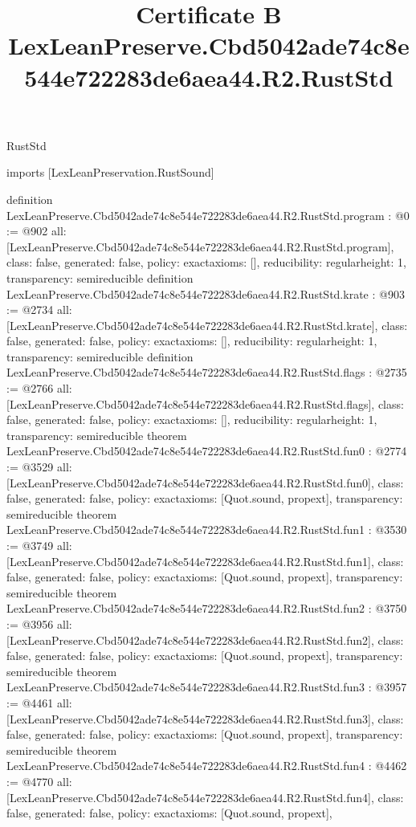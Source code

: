 \begin{lexlean}{RustStd}
\title{Certificate B LexLeanPreserve.Cbd5042ade74c8e544e722283de6aea44.R2.RustStd}
\begin{coremodule}
imports [LexLeanPreservation.RustSound]

definition LexLeanPreserve.Cbd5042ade74c8e544e722283de6aea44.R2.RustStd.program : @0 := @902 {
  all: [LexLeanPreserve.Cbd5042ade74c8e544e722283de6aea44.R2.RustStd.program],
  class: false,
  generated: false,
  policy: exact{axioms: []},
  reducibility: regular{height: 1},
  transparency: semireducible
}
definition LexLeanPreserve.Cbd5042ade74c8e544e722283de6aea44.R2.RustStd.krate : @903 := @2734 {
  all: [LexLeanPreserve.Cbd5042ade74c8e544e722283de6aea44.R2.RustStd.krate],
  class: false,
  generated: false,
  policy: exact{axioms: []},
  reducibility: regular{height: 1},
  transparency: semireducible
}
definition LexLeanPreserve.Cbd5042ade74c8e544e722283de6aea44.R2.RustStd.flags : @2735 := @2766 {
  all: [LexLeanPreserve.Cbd5042ade74c8e544e722283de6aea44.R2.RustStd.flags],
  class: false,
  generated: false,
  policy: exact{axioms: []},
  reducibility: regular{height: 1},
  transparency: semireducible
}
theorem LexLeanPreserve.Cbd5042ade74c8e544e722283de6aea44.R2.RustStd.fun0 : @2774 := @3529 {
  all: [LexLeanPreserve.Cbd5042ade74c8e544e722283de6aea44.R2.RustStd.fun0],
  class: false,
  generated: false,
  policy: exact{axioms: [Quot.sound, propext]},
  transparency: semireducible
}
theorem LexLeanPreserve.Cbd5042ade74c8e544e722283de6aea44.R2.RustStd.fun1 : @3530 := @3749 {
  all: [LexLeanPreserve.Cbd5042ade74c8e544e722283de6aea44.R2.RustStd.fun1],
  class: false,
  generated: false,
  policy: exact{axioms: [Quot.sound, propext]},
  transparency: semireducible
}
theorem LexLeanPreserve.Cbd5042ade74c8e544e722283de6aea44.R2.RustStd.fun2 : @3750 := @3956 {
  all: [LexLeanPreserve.Cbd5042ade74c8e544e722283de6aea44.R2.RustStd.fun2],
  class: false,
  generated: false,
  policy: exact{axioms: [Quot.sound, propext]},
  transparency: semireducible
}
theorem LexLeanPreserve.Cbd5042ade74c8e544e722283de6aea44.R2.RustStd.fun3 : @3957 := @4461 {
  all: [LexLeanPreserve.Cbd5042ade74c8e544e722283de6aea44.R2.RustStd.fun3],
  class: false,
  generated: false,
  policy: exact{axioms: [Quot.sound, propext]},
  transparency: semireducible
}
theorem LexLeanPreserve.Cbd5042ade74c8e544e722283de6aea44.R2.RustStd.fun4 : @4462 := @4770 {
  all: [LexLeanPreserve.Cbd5042ade74c8e544e722283de6aea44.R2.RustStd.fun4],
  class: false,
  generated: false,
  policy: exact{axioms: [Quot.sound, propext]},
}
\end{coremodule}
\end{lexlean}
